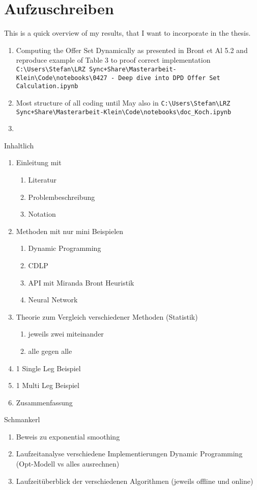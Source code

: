 \chapter{Aufzuschreiben}

This is a quick overview of my results, that I want to incorporate in the thesis.

\begin{enumerate}
	\item Computing the Offer Set Dynamically as presented in Bront et Al 5.2 and reproduce example of Table 3 to proof correct implementation \texttt{C:\textbackslash  Users\textbackslash  Stefan\textbackslash  LRZ Sync+Share\textbackslash  Masterarbeit-Klein\textbackslash  Code\textbackslash  notebooks\textbackslash  0427 - Deep dive into DPD Offer Set Calculation.ipynb}
	\item Most structure of all coding until May also in \texttt{C:\textbackslash  Users\textbackslash  Stefan\textbackslash  LRZ Sync+Share\textbackslash  Masterarbeit-Klein\textbackslash  Code\textbackslash  notebooks\textbackslash  doc\_Koch.ipynb}
\item \end{enumerate}

\newpage
Inhaltlich

\begin{enumerate}
	\item Einleitung mit 
	\begin{enumerate}
		\item Literatur
		\item Problembeschreibung
		\item Notation
	\end{enumerate} 
	\item Methoden mit nur mini Beispielen
	\begin{enumerate}
		\item Dynamic Programming
		\item CDLP
		\item API mit Miranda Bront Heuristik
		\item Neural Network
	\end{enumerate}
	\item Theorie zum Vergleich verschiedener Methoden (Statistik)
	\begin{enumerate}
		\item jeweils zwei miteinander
		\item alle gegen alle
	\end{enumerate}
	\item 1 Single Leg Beispiel
	\item 1 Multi Leg Beispiel
	\item Zusammenfassung
\end{enumerate}

Schmankerl

\begin{enumerate}
	\item Beweis zu exponential smoothing
	\item Laufzeitanalyse verschiedene Implementierungen Dynamic Programming (Opt-Modell vs alles ausrechnen)
	\item Laufzeitüberblick der verschiedenen Algorithmen (jeweils offline und online)
\end{enumerate}
